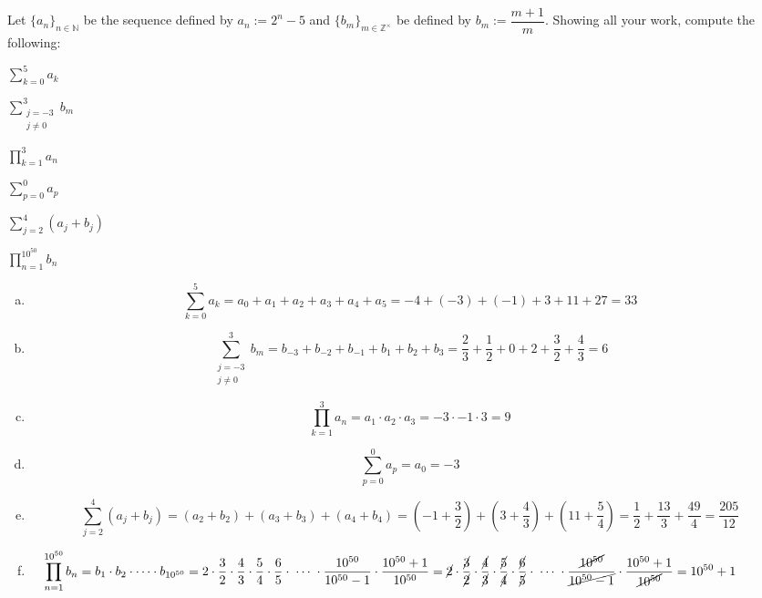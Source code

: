\documentclass[11pt,letterpaper]{article}
\begin{document}

 Let $\{ a_n \}_{n \in \mathbb{N}}$ be the sequence defined by $a_n:= 2^n - 5$ and $\{ b_m \}_{m \in \mathbb{Z}^\times}$ be defined by $b_m:= \dfrac{m + 1}{m}$. Showing all your work, compute the following:
	\begin{2enumerate}
	\item $\displaystyle \sum_{k= 0}^5 a_k$
	\item $\displaystyle \sum_{\substack{j= -3 \\ j \neq 0}}^3 b_m$
	\item $\displaystyle \prod_{k= 1}^3 a_n$
	\item $\displaystyle \sum_{p=0}^0 a_p$
	\item $\displaystyle \sum_{j=2}^4 (a_j + b_j)$
	\item $\displaystyle \prod_{n=1}^{10^{50}} b_n$
	\end{2enumerate} \pspace

\sol 
\begin{enumerate}[(a)]
\item 
	\[
	\sum_{k= 0}^5 a_k= a_0 + a_1 + a_2 + a_3 + a_4 + a_5= -4 + (-3) + (-1) + 3 + 11 + 27= 33
	\]

\item 
	\[
	\sum_{\substack{j= -3 \\ j \neq 0}}^3 b_m= b_{-3} + b_{-2} + b_{-1} + b_1 + b_2 + b_3= \dfrac{2}{3} + \dfrac{1}{2} + 0 + 2 + \dfrac{3}{2} + \dfrac{4}{3}= 6
	\]

\item 
	\[
	\prod_{k= 1}^3 a_n= a_1 \cdot a_2 \cdot a_3= -3 \cdot -1 \cdot 3= 9
	\]

\item 
	\[
	\sum_{p=0}^0 a_p= a_0= -3
	\]

\item 
	\[
	\sum_{j=2}^4 (a_j + b_j)= (a_2 + b_2) + (a_3 + b_3) + (a_4 + b_4)= \left(-1 + \dfrac{3}{2} \right) + \left(3 + \dfrac{4}{3} \right) + \left(11 + \dfrac{5}{4} \right)= \dfrac{1}{2} + \dfrac{13}{3} + \dfrac{49}{4}= \dfrac{205}{12}
	\]

\item 
	\[
	\hspace{-1.1cm} \prod_{n=1}^{10^{50}} b_n= b_1 \cdot b_2 \cdot \cdots \cdot b_{10^{50}}= 2 \cdot \dfrac{3}{2} \cdot \dfrac{4}{3} \cdot \dfrac{5}{4} \cdot \dfrac{6}{5} \cdot\; \cdots\; \cdot \dfrac{10^{50}}{10^{50} - 1} \cdot \dfrac{10^{50} + 1}{10^{50}}= \cancel{2} \cdot \dfrac{\cancel{3}}{\cancel{2}} \cdot \dfrac{\cancel{4}}{\cancel{3}} \cdot \dfrac{\cancel{5}}{\cancel{4}} \cdot \dfrac{\cancel{6}}{\cancel{5}} \cdot\; \cdots\; \cdot \dfrac{\cancel{10^{50}}}{\cancel{10^{50} - 1}} \cdot \dfrac{10^{50} + 1}{\cancel{10^{50}}}= 10^{50} + 1
	\]
\end{enumerate}
\end{document}
